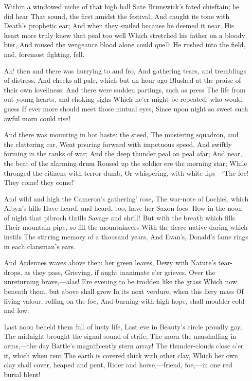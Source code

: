\documentclass[10pt,twocolumn]{book}
\begin{document}
   Within a windowed niche of that high hall
   Sate Brunswick's fated chieftain; he did hear
   That sound, the first amidst the festival,
   And caught its tone with Death's prophetic ear;
   And when they smiled because he deemed it near,
   His heart more truly knew that peal too well
   Which stretched his father on a bloody bier,
   And roused the vengeance blood alone could quell:
He rushed into the field, and, foremost fighting, fell.

   Ah! then and there was hurrying to and fro,
   And gathering tears, and tremblings of distress,
   And cheeks all pale, which but an hour ago
   Blushed at the praise of their own loveliness;
   And there were sudden partings, such as press
   The life from out young hearts, and choking sighs
   Which ne'er might be repeated:  who would guess
   If ever more should meet those mutual eyes,
Since upon night so sweet such awful morn could rise!


   And there was mounting in hot haste:  the steed,
   The mustering squadron, and the clattering car,
   Went pouring forward with impetuous speed,
   And swiftly forming in the ranks of war;
   And the deep thunder peal on peal afar;
   And near, the beat of the alarming drum
   Roused up the soldier ere the morning star;
   While thronged the citizens with terror dumb,
Or whispering, with white lips---`The foe!  They come! they come!'


   And wild and high the Cameron's gathering' rose,
   The war-note of Lochiel, which Albyn's hills
   Have heard, and heard, too, have her Saxon foes:
   How in the noon of night that pibroch thrills
   Savage and shrill!  But with the breath which fills
   Their mountain-pipe, so fill the mountaineers
   With the fierce native daring which instils
   The stirring memory of a thousand years,
And Evan's, Donald's fame rings in each clansman's ears.


   And Ardennes waves above them her green leaves,
   Dewy with Nature's tear-drops, as they pass,
   Grieving, if aught inanimate e'er grieves,
   Over the unreturniug brave,---alas!
   Ere evening to be trodden like the grass
   Which now beneath them, but above shall grow
   In its next verdure, when this fiery mass
   Of living valour, rolling on the foe,
And burning with high hope, shall moulder cold and low.


   Last noon beheld them full of lusty life,
   Last eve in Beauty's circle proudly gay,
   The midnight brought the signal-sound of strife,
   The morn the marshalling in arms,---the day
   Battle's magnificently stern array!
   The thunder-clouds close o'er it, which when rent
   The earth is covered thick with other clay,
   Which her own clay shall cover, heaped and pent,
Rider and horse,---friend, foe,---in one red burial blent!
\end{document}
